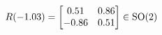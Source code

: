 \documentclass[preview]{standalone}
\begin{document}
\begin{align*}
\special{dvisvgm:raw <g id='unique000'>}R(-1.03) = \begin{bmatrix} 0.51 & 0.86 \\ -0.86 & 0.51 \end{bmatrix} \in \text{SO}(2)\special{dvisvgm:raw </g>}
\end{align*}
\end{document}
